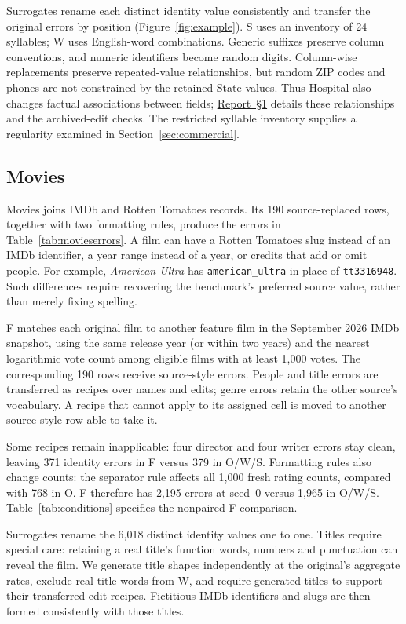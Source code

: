 \documentclass[sigconf, nonacm]{acmart}
\newcommand{\companionref}[1]{\href{https://github.com/hinsonver/CoRe-Benchmark/raw/refs/heads/main/paper/CoRe-Supplementary-Technical-Report.pdf\#nameddest=companion-#1}{Report~\S#1}}
\begin{document}
Surrogates rename each distinct identity value consistently and transfer the original errors
by position (Figure~\ref{fig:example}). S uses an inventory of 24 syllables; W uses English-word
combinations. Generic suffixes preserve column conventions, and numeric identifiers become
random digits. Column-wise replacements preserve repeated-value relationships, but random
ZIP codes and phones are not constrained by the retained State values. Thus Hospital also
changes factual associations between fields; \companionref{1} details these relationships
and the archived-edit checks. The restricted syllable inventory supplies a regularity examined
in Section~\ref{sec:commercial}.

\subsection{Movies}\label{sec:build-movies}

Movies joins IMDb and Rotten Tomatoes records. Its 190 source-replaced rows, together with two
formatting rules, produce the errors in Table~\ref{tab:movieserrors}. A film can have a Rotten
Tomatoes slug instead of an IMDb identifier, a year range instead of a year, or credits that
add or omit people. For example, \emph{American Ultra} has \texttt{american\_ultra} in place of
\texttt{tt3316948}. Such differences require recovering the benchmark's preferred source value,
rather than merely fixing spelling.



F matches each original film to another feature film in the September 2026 IMDb snapshot,
using the same release year (or within two years) and the nearest logarithmic vote count among
eligible films with at least 1,000 votes. The corresponding 190 rows receive source-style errors.
People and title errors are transferred as recipes over names and edits; genre errors retain
the other source's vocabulary. A recipe that cannot apply to its assigned cell is moved to
another source-style row able to take it.

Some recipes remain inapplicable: four director and four writer errors stay clean, leaving 371
identity errors in F versus 379 in O/W/S. Formatting rules also change counts: the separator
rule affects all 1,000 fresh rating counts, compared with 768 in O. F therefore has 2,195 errors
at seed~0 versus 1,965 in O/W/S. Table~\ref{tab:conditions} specifies the nonpaired F comparison.

Surrogates rename the 6,018 distinct identity values one to one. Titles require special care:
retaining a real title's function words, numbers and punctuation can reveal the film. We
generate title shapes independently at the original's aggregate rates, exclude real title
words from W, and require generated titles to support their transferred edit recipes. Fictitious
IMDb identifiers and slugs are then formed consistently with those titles.
\end{document}
